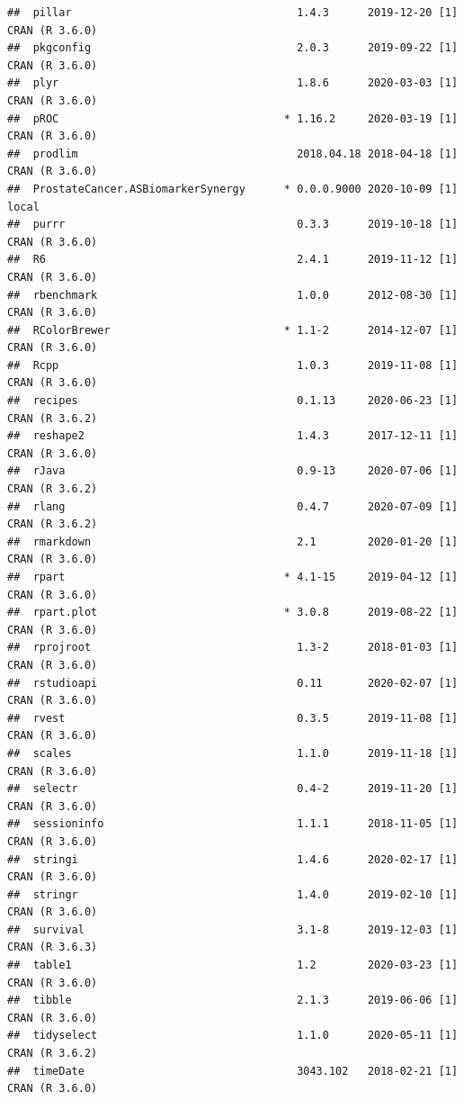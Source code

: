 \documentclass[]{article}
\begin{document}
\begin{verbatim}
##  pillar                                   1.4.3      2019-12-20 [1] CRAN (R 3.6.0)
##  pkgconfig                                2.0.3      2019-09-22 [1] CRAN (R 3.6.0)
##  plyr                                     1.8.6      2020-03-03 [1] CRAN (R 3.6.0)
##  pROC                                   * 1.16.2     2020-03-19 [1] CRAN (R 3.6.0)
##  prodlim                                  2018.04.18 2018-04-18 [1] CRAN (R 3.6.0)
##  ProstateCancer.ASBiomarkerSynergy      * 0.0.0.9000 2020-10-09 [1] local         
##  purrr                                    0.3.3      2019-10-18 [1] CRAN (R 3.6.0)
##  R6                                       2.4.1      2019-11-12 [1] CRAN (R 3.6.0)
##  rbenchmark                               1.0.0      2012-08-30 [1] CRAN (R 3.6.0)
##  RColorBrewer                           * 1.1-2      2014-12-07 [1] CRAN (R 3.6.0)
##  Rcpp                                     1.0.3      2019-11-08 [1] CRAN (R 3.6.0)
##  recipes                                  0.1.13     2020-06-23 [1] CRAN (R 3.6.2)
##  reshape2                                 1.4.3      2017-12-11 [1] CRAN (R 3.6.0)
##  rJava                                    0.9-13     2020-07-06 [1] CRAN (R 3.6.2)
##  rlang                                    0.4.7      2020-07-09 [1] CRAN (R 3.6.2)
##  rmarkdown                                2.1        2020-01-20 [1] CRAN (R 3.6.0)
##  rpart                                  * 4.1-15     2019-04-12 [1] CRAN (R 3.6.0)
##  rpart.plot                             * 3.0.8      2019-08-22 [1] CRAN (R 3.6.0)
##  rprojroot                                1.3-2      2018-01-03 [1] CRAN (R 3.6.0)
##  rstudioapi                               0.11       2020-02-07 [1] CRAN (R 3.6.0)
##  rvest                                    0.3.5      2019-11-08 [1] CRAN (R 3.6.0)
##  scales                                   1.1.0      2019-11-18 [1] CRAN (R 3.6.0)
##  selectr                                  0.4-2      2019-11-20 [1] CRAN (R 3.6.0)
##  sessioninfo                              1.1.1      2018-11-05 [1] CRAN (R 3.6.0)
##  stringi                                  1.4.6      2020-02-17 [1] CRAN (R 3.6.0)
##  stringr                                  1.4.0      2019-02-10 [1] CRAN (R 3.6.0)
##  survival                                 3.1-8      2019-12-03 [1] CRAN (R 3.6.3)
##  table1                                   1.2        2020-03-23 [1] CRAN (R 3.6.0)
##  tibble                                   2.1.3      2019-06-06 [1] CRAN (R 3.6.0)
##  tidyselect                               1.1.0      2020-05-11 [1] CRAN (R 3.6.2)
##  timeDate                                 3043.102   2018-02-21 [1] CRAN (R 3.6.0)

\end{verbatim}
\end{document}

